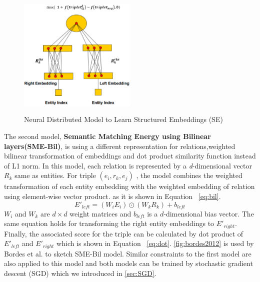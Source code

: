     \begin{figure}[h!]
  \caption{Neural Distributed Model to Learn Structured Embeddings (SE)}
  \centering
    \includegraphics[width=0.5\textwidth]{bordes2011.eps}
    \label{fig:bordes2011}
\end{figure} 
    The second model, \textbf{Semantic Matching Energy using Bilinear layers(SME-Bil)}, 
    is using a different representation for relations,weighted bilinear
    transformation of embeddings and  dot product similarity function instead of L1 norm. 
    In this model, each relation is represented by a \textit{d}-dimensional vector $R_{k}$ same as entities. 
    For triple $(e_{i},r_{k} , e_{j} )$ , the model combines the weighted transformation of each entity embedding with 
    the weighted embedding of relation using element-wise vector product. as it is shown in Equation ~\eqref{eq:bil}.
    \begin{equation}
    \label{eq:bil} E'_{left} = (W_{i} E_{i}) \odot (W_{k} R_{k}) + b_{left}
    \end{equation}
    $W_{i}$ and $W_{k}$ are $d \times d$ weight matrices and $b_{left}$ is a $d$-dimensional bias vector. 
    The same equation holds for transforming the right entity embeddings to $E'_{right}$. Finally, the associated score for the triple
     can be calculated by dot product of $E'_{left}$ and $E'_{right}$ which is
     shown in Equation ~\ref{eq:dot}. \autoref{fig:bordes2012} is used by Bordes
     et al. to sketch SME-Bil model. Similar constraints to the first model are also applied to this model and 
     both models can be trained by stochastic gradient descent (SGD) which we
     introduced in \autoref{sec:SGD}.
    
